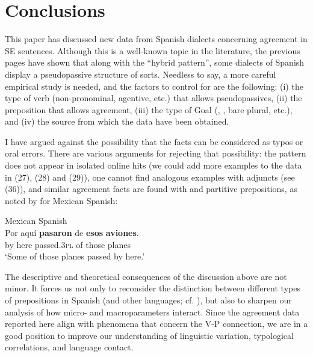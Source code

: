 \documentclass[output=paper]{langsci/langscibook}
\begin{document}
\section{Conclusions}%
This paper has discussed new data from Spanish dialects concerning agreement in SE sentences. Although this is a well-known topic in the literature, the previous pages have shown that along with the “hybrid pattern”, some dialects of Spanish display a pseudopassive structure of sorts. Needless to say, a more careful empirical study is needed, and the factors to control for are the following: (i) the type of verb (non-pronominal, agentive, etc.) that allows pseudopassives, (ii) the preposition that allows agreement, (iii) the type of Goal (\CATDP, \CATNP, bare plural, etc.), and (iv) the source from which the data have been obtained. 

I have argued against the possibility that the facts can be considered as typos or oral errors. There are various arguments for rejecting that possibility: the pattern does not appear in isolated online hits (we could add more examples to the data in (27), (28) and (29)), one cannot find analogous examples with adjuncts (see (36)), and similar agreement facts are found with \DOM and partitive prepositions, as noted by \citet{Treviño2010} for Mexican Spanish:

 
\ea%
    Mexican Spanish\label{ex:gallego:43}\\
    \gll Por  aquí   \textbf{pasaron}      de  \textbf{esos}   \textbf{aviones}. \\
         by    here  passed.\textsc{3pl}  of  those  planes\\
    \glt ‘Some of those planes passed by here.’
\z

The descriptive and theoretical consequences of the discussion above are not minor. It forces us not only to reconsider the distinction between different types of prepositions in Spanish (and other languages; cf. \citealt{Demonte1987,Demonte1991,Demonte1995,Abels2003,Cuervo2003,Pesetsky2004,Romero2011}), but also to sharpen our analysis of how micro- and macroparameters interact. Since the agreement data reported here align with phenomena that concern the V-P connection, we are in a good position to improve our understanding of linguistic variation, typological correlations, and language contact.
\end{document}
